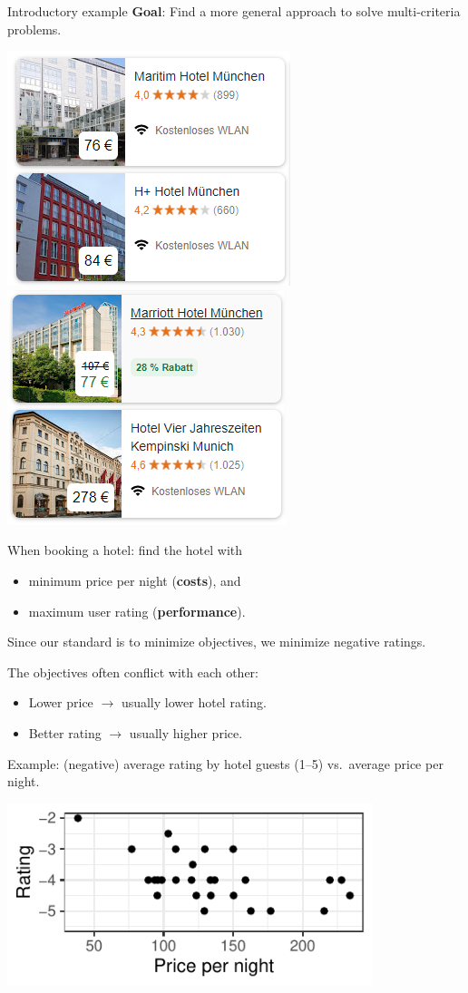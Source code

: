 \documentclass[11pt,compress,t,notes=noshow,xcolor=table]{beamer}
\begin{document}
\begin{vbframe}{Introductory example}
\bigskip
\textbf{Goal}: Find a more general approach to solve multi-criteria problems.

\begin{center}
\includegraphics[width=0.35\linewidth]{slides/11-multicrit/figure_man/booking1.png}
\quad
\includegraphics[width=0.35\linewidth]{slides/11-multicrit/figure_man/booking2.png}
\end{center}

When booking a hotel: find the hotel with
\begin{itemize}
\item minimum price per night (\textbf{costs}), and
\item maximum user rating (\textbf{performance}).
\end{itemize}

\begin{footnotesize}
Since our standard is to minimize objectives, we minimize negative ratings.
\end{footnotesize}

\framebreak

The objectives often conflict with each other:
\begin{itemize}
\item Lower price $\to$ usually lower hotel rating.
\item Better rating $\to$ usually higher price.
\end{itemize}

Example: (negative) average rating by hotel guests (1--5) vs.\ average price per night.

\bigskip
\begin{center}
\includegraphics[width=0.8\textwidth]{slides/11-multicrit/figure_man/expedia-1-1.pdf}
\end{center}


\end{vbframe}
\end{document}
